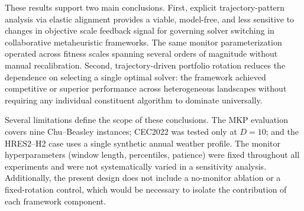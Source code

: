 \documentclass[review]{elsarticle}
\begin{document}
These results support two main conclusions. First, explicit trajectory-pattern analysis via elastic alignment provides a viable, model-free, and less sensitive to changes in objective scale feedback signal for governing solver switching in collaborative metaheuristic frameworks. The same monitor parameterization operated across fitness scales spanning several orders of magnitude without manual recalibration. Second, trajectory-driven portfolio rotation reduces the dependence on selecting a single optimal solver: the framework achieved competitive or superior performance across heterogeneous landscapes without requiring any individual constituent algorithm to dominate universally.

Several limitations define the scope of these conclusions. The MKP evaluation covers nine Chu--Beasley instances; CEC2022 was tested only at $D=10$; and the HRES2--H2 case uses a single synthetic annual weather profile. The monitor hyperparameters (window length, percentiles, patience) were fixed throughout all experiments and were not systematically varied in a sensitivity analysis. Additionally, the present design does not include a no-monitor ablation or a fixed-rotation control, which would be necessary to isolate the contribution of each framework component.
\end{document}
